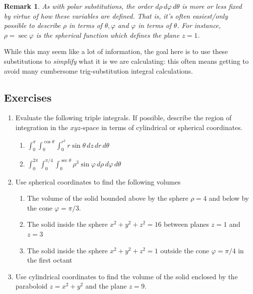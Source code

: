 \documentclass[12pt]{article}
\numberwithin{equation}{subsection}
\numberwithin{figure}{subsection}
\theoremstyle{note}
\newtheorem{remark}[subsection]{Remark}
\begin{document}
{\begin{remark}
As with polar substitutions, the order $d\rho\, d\varphi\, d\theta$ is more or less fixed by virtue of how these variables are defined. That is, it's often easiest/only possible to describe $\rho$ in terms of $\theta, \varphi$ and $\varphi$ in terms of $\theta$. For instance, $\rho=\sec\varphi$ is the spherical function which defines the plane $z=1$.

 \end{remark}

While this may seem like a lot of information, the goal here is to use these substitutions to \textit{simplify} what it is we are calculating: this often means getting to avoid many cumbersome trig-substitution integral calculations.

\subsection{Exercises}
\begin{enumerate}[label=\arabic*.]
\item Evaluate the following triple integrals. If possible, describe the region of integration in the $xyz$-space in terms of cylindrical or spherical coordinates.

\begin{enumerate}
	\item $\displaystyle \int_0^{\pi} \int_0^{\cos \theta} \int_0^{r^2} r\sin \theta \,dz  \,dr\, d\theta$
	\item $\displaystyle \int_0^{2\pi} \int_{0}^{\pi/4} \int_0^{\sec \theta}  \rho^3 \sin \varphi \,d \rho\,d\varphi\,d\theta$
\end{enumerate}

\item Use spherical coordinates to find the following volumes

\begin{enumerate}
	\item The volume of the solid bounded above by the sphere $\rho=4$ and below by the cone $\varphi=\pi/3$. 
	\item The solid inside the sphere $x^2+y^2+z^2=16$ between planes $z=1$ and $z=3$
	\item The solid inside the sphere $x^2+y^2+z^2=1$ outside the cone $\varphi=\pi/4$ in the first octant
\end{enumerate}

\item  Use cylindrical coordinates to find the volume of the solid enclosed by the paraboloid $z=x^2+y^2$ and the plane $z=9$. 


\end{enumerate}}
\end{document}
